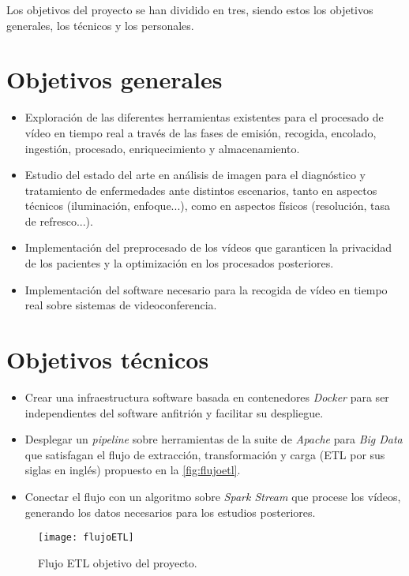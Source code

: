 Los objetivos del proyecto se han dividido en tres, siendo estos los objetivos generales, los técnicos y los personales.

\section{Objetivos generales}

\begin{itemize}
	\item Exploración de las diferentes herramientas existentes para el procesado de vídeo en tiempo real a través de las fases de emisión, recogida, encolado, ingestión, procesado, enriquecimiento y almacenamiento.
	\item Estudio del estado del arte en análisis de imagen para el diagnóstico y tratamiento de enfermedades ante distintos escenarios, tanto en aspectos técnicos (iluminación, enfoque...), como en aspectos físicos (resolución, tasa de refresco...).
	\item Implementación del preprocesado de los vídeos que garanticen la privacidad de los pacientes y la optimización en los procesados posteriores. 
	\item Implementación del software necesario para la recogida de vídeo en tiempo real sobre sistemas de videoconferencia.
\end{itemize}

\section{Objetivos técnicos}

\begin{itemize}
	\item Crear una infraestructura software basada en contenedores \textit{Docker} para ser independientes del software anfitrión y facilitar su despliegue.
	\item Desplegar un \textit{pipeline} sobre herramientas de la suite de \textit{Apache} para \textit{Big Data} que satisfagan el flujo de extracción, transformación y carga (ETL por sus siglas en inglés) propuesto en la \autoref{fig:flujoetl}.
	\item Conectar el flujo con un algoritmo sobre \textit{Spark Stream} que procese los vídeos, generando los datos necesarios para los estudios posteriores. 
\end{itemize}

\begin{figure}
	\centering
	\texttt{[image: flujoETL]}
	\caption{Flujo ETL objetivo del proyecto.}
	\label{fig:flujoetl}
\end{figure}


